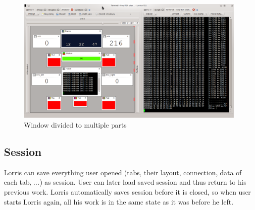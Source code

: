 \documentclass[12pt, a4paper, oneside]{article}
\begin{document}
\begin{figure}[H]
\begin{center}
\includegraphics[width=\textwidth]{img/split.png}
\caption{Window divided to multiple parts}
\label{split_img}
\end{center}
\end{figure}

\subsection{Session}
Lorris can save everything user opened (tabs, their layout, connection, data of each tab, ...) as session. User can later load saved session and thus return to his previous work. Lorris automatically saves session before it is closed, so when user starts Lorris again, all his work is in the same state as it was before he left.
\end{document}
